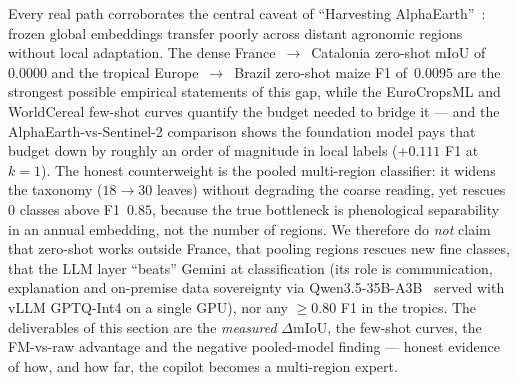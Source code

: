 Every real path corroborates the central caveat of ``Harvesting
AlphaEarth''~\cite{harvesting2026alphaearth}: frozen global embeddings transfer poorly
across distant agronomic regions without local adaptation. The dense
France~$\rightarrow$~Catalonia zero-shot mIoU of~$0.0000$ and the tropical
Europe~$\rightarrow$~Brazil zero-shot maize F1 of~$0.0095$ are the strongest possible
empirical statements of this gap, while the EuroCropsML and WorldCereal few-shot curves
quantify the budget needed to bridge it --- and the AlphaEarth-vs-Sentinel-2 comparison
shows the foundation model pays that budget down by roughly an order of magnitude in local
labels ($+0.111$ F1 at $k{=}1$). The honest counterweight is the pooled multi-region
classifier: it widens the taxonomy ($18\rightarrow30$ leaves) without degrading the coarse
reading, yet rescues $0$ classes above F1~$0.85$, because the true bottleneck is
phenological separability in an annual embedding, not the number of regions. We therefore do
\emph{not} claim that zero-shot works outside France, that pooling regions rescues new fine
classes, that the LLM layer ``beats'' Gemini at classification (its role is communication,
explanation and on-premise data sovereignty via Qwen3.5-35B-A3B~\cite{yang2025qwen3} served
with vLLM GPTQ-Int4 on a single GPU), nor any $\geq$0.80 F1 in the tropics. The
deliverables of this section are the \emph{measured} $\Delta$mIoU, the few-shot curves, the
FM-vs-raw advantage and the negative pooled-model finding --- honest evidence of how, and how
far, the copilot becomes a multi-region expert.

